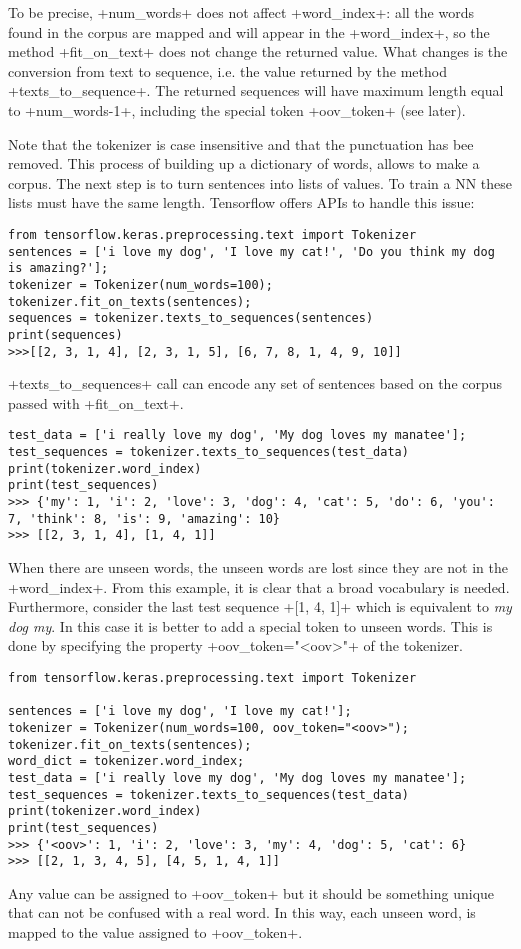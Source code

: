 To be precise, \cd+num_words+ does not affect \cd+word_index+: all the words found in the corpus are mapped and will appear in the \cd+word_index+, so the method \cd+fit_on_text+ does not change the returned value. What changes is the conversion from text to sequence, i.e. the value returned by the method \cd+texts_to_sequence+. The returned sequences will have maximum length equal to \cd+num_words-1+, including the special token \cd+oov_token+ (see later).

Note that the tokenizer is case insensitive and that the punctuation has bee removed. This process of building up a dictionary of words, allows to make a corpus. The next step is to turn sentences into lists of values. To train a NN these lists must have the same length. Tensorflow offers APIs to handle this issue:
\begin{lstlisting}
from tensorflow.keras.preprocessing.text import Tokenizer
sentences = ['i love my dog', 'I love my cat!', 'Do you think my dog is amazing?'];
tokenizer = Tokenizer(num_words=100);
tokenizer.fit_on_texts(sentences);
sequences = tokenizer.texts_to_sequences(sentences)
print(sequences)
>>>[[2, 3, 1, 4], [2, 3, 1, 5], [6, 7, 8, 1, 4, 9, 10]]
\end{lstlisting}
\cd+texts_to_sequences+ call can encode any set of sentences based on the corpus passed with \cd+fit_on_text+.

\begin{lstlisting}
test_data = ['i really love my dog', 'My dog loves my manatee'];
test_sequences = tokenizer.texts_to_sequences(test_data)
print(tokenizer.word_index)
print(test_sequences)
>>> {'my': 1, 'i': 2, 'love': 3, 'dog': 4, 'cat': 5, 'do': 6, 'you': 7, 'think': 8, 'is': 9, 'amazing': 10}
>>> [[2, 3, 1, 4], [1, 4, 1]]
\end{lstlisting}
When there are unseen words, the unseen words are lost since they are not in the \cd+word_index+. From this example, it is clear that a broad vocabulary is needed. Furthermore, consider the last test sequence \cd+[1, 4, 1]+ which is equivalent to \textit{my dog my}. In this case it is better to add a special token to unseen words. This is done by specifying the property \cd+oov_token="<oov>"+ of the tokenizer.

\begin{lstlisting}
from tensorflow.keras.preprocessing.text import Tokenizer

sentences = ['i love my dog', 'I love my cat!'];
tokenizer = Tokenizer(num_words=100, oov_token="<oov>");
tokenizer.fit_on_texts(sentences);
word_dict = tokenizer.word_index;
test_data = ['i really love my dog', 'My dog loves my manatee'];
test_sequences = tokenizer.texts_to_sequences(test_data)
print(tokenizer.word_index)
print(test_sequences)
>>> {'<oov>': 1, 'i': 2, 'love': 3, 'my': 4, 'dog': 5, 'cat': 6}
>>> [[2, 1, 3, 4, 5], [4, 5, 1, 4, 1]]
\end{lstlisting}
Any value can be assigned to \cd+oov_token+ but it should be something unique that can not be confused with a real word.  In this way, each unseen word, is mapped to the value assigned to \cd+oov_token+.

